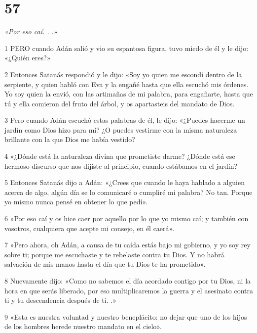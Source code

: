 \chapter{57}

\par \textit{«Por eso caí. . .}»

\par 1 PERO cuando Adán salió y vio su espantosa figura, tuvo miedo de él y le dijo: «¿Quién eres?»

\par 2 Entonces Satanás respondió y le dijo: «Soy yo quien me escondí dentro de la serpiente, y quien habló con Eva y la engañé hasta que ella escuchó mis órdenes. Yo soy quien la envió, con las artimañas de mi palabra, para engañarte, hasta que tú y ella comieron del fruto del árbol, y os apartasteis del mandato de Dios.

\par 3 Pero cuando Adán escuchó estas palabras de él, le dijo: «¿Puedes hacerme un jardín como Dios hizo para mí? ¿O puedes vestirme con la misma naturaleza brillante con la que Dios me había vestido?

\par 4 «¿Dónde está la naturaleza divina que prometiste darme? ¿Dónde está ese hermoso discurso que nos dijiste al principio, cuando estábamos en el jardín?

\par 5 Entonces Satanás dijo a Adán: «¿Crees que cuando le haya hablado a alguien acerca de algo, algún día se lo comunicaré o cumpliré mi palabra? No tan. Porque yo mismo nunca pensé en obtener lo que pedí».

\par 6 »Por eso caí y os hice caer por aquello por lo que yo mismo caí; y también con vosotros, cualquiera que acepte mi consejo, en él caerá».

\par 7 »Pero ahora, oh Adán, a causa de tu caída estás bajo mi gobierno, y yo soy rey ​​sobre ti; porque me escuchaste y te rebelaste contra tu Dios. Y no habrá salvación de mis manos hasta el día que tu Dios te ha prometido».

\par 8 Nuevamente dijo: «Como no sabemos el día acordado contigo por tu Dios, ni la hora en que serás liberado, por eso multiplicaremos la guerra y el asesinato contra ti y tu descendencia después de ti. .»

\par 9 «Esta es nuestra voluntad y nuestro beneplácito: no dejar que uno de los hijos de los hombres herede nuestro mandato en el cielo».

